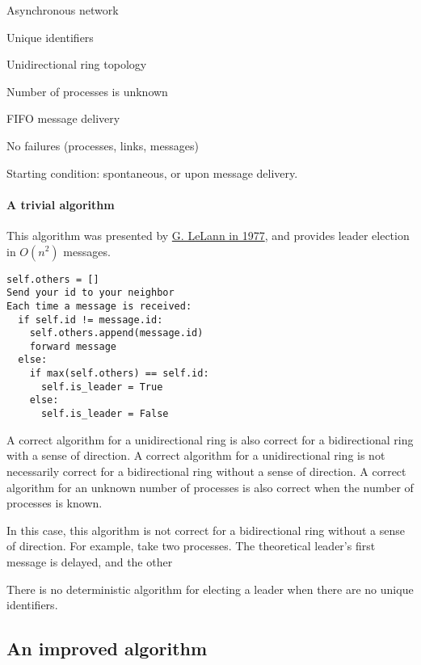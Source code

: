 \documentclass{idc_msc}
\begin{document}
\begin{itemize*}
  \item Asynchronous network
  \item Unique identifiers
  \item Unidirectional ring topology
  \item Number of processes is unknown
  \item FIFO message delivery
  \item No failures (processes, links, messages)
  \item Starting condition: spontaneous, or upon message delivery.
\end{itemize*}

\paragraph{A trivial algorithm}

This algorithm was presented by \href{https://www-rocq.inria.fr/novaltis/publications/IFIP%20Congress%201977.pdf}{G. LeLann in 1977}, and provides leader election in $O(n^2)$ messages.

\begin{lstlisting}[frame=L,mathescape=true,title={For processes $i=1...n$}]
self.others = []
Send your id to your neighbor
Each time a message is received:
  if self.id != message.id:
    self.others.append(message.id)
    forward message
  else:
    if max(self.others) == self.id:
      self.is_leader = True
    else:
      self.is_leader = False
\end{lstlisting}

A correct algorithm for a unidirectional ring is also correct for a bidirectional ring with a sense of direction.
A correct algorithm for a unidirectional ring is not necessarily correct for a bidirectional ring without a sense of direction.
A correct algorithm for an unknown number of processes is also correct when the number of processes is known.

In this case, this algorithm is not correct for a bidirectional ring without a sense of direction.
For example, take two processes. The theoretical leader's first message is delayed, and the other

There is no deterministic algorithm for electing a leader when there are no unique identifiers.

\subsection{An improved algorithm}
\end{document}
